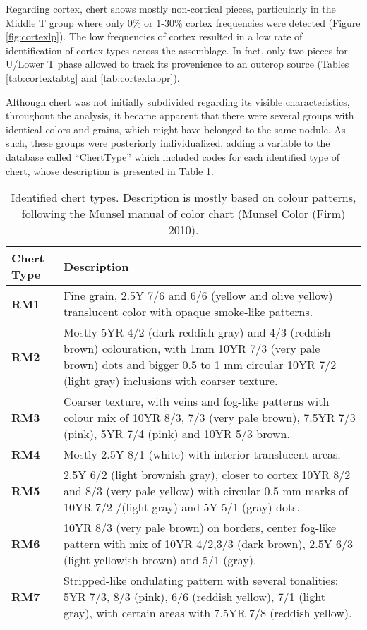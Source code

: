 \documentclass[12pt,twoside]{reedthesis}
\begin{document}
Regarding cortex, chert shows mostly non-cortical pieces, particularly in the Middle T group where only 0\% or 1-30\% cortex frequencies were detected (Figure \ref{fig:cortexlp}). The low frequencies of cortex resulted in a low rate of identification of cortex types across the assemblage. In fact, only two pieces for U/Lower T phase allowed to track its provenience to an outcrop source (Tables \ref{tab:cortextabtg} and \ref{tab:cortextabpr}).

Although chert was not initially subdivided regarding its visible characteristics, throughout the analysis, it became apparent that there were several groups with identical colors and grains, which might have belonged to the same nodule. As such, these groups were posteriorly individualized, adding a variable to the database called ``ChertType'' which included codes for each identified type of chert, whose description is presented in Table \ref{tab:cherttable}.
\begin{table}

\caption{\label{tab:cherttable}Identified chert types. Description is mostly based on colour patterns, following the Munsel manual of color chart (Munsel Color (Firm) 2010).}
\centering
\begin{tabular}[t]{>{\bfseries}l>{\raggedright\arraybackslash}p{10cm}}
\toprule
Chert Type & Description\\
\midrule
RM1 & Fine grain, 2.5Y 7/6 and 6/6 (yellow and olive yellow) translucent color with opaque smoke-like patterns.\\
RM2 & Mostly 5YR 4/2 (dark reddish gray) and 4/3 (reddish brown) colouration, with 1mm 10YR 7/3 (very pale brown) dots and bigger 0.5 to 1 mm circular 10YR 7/2 (light gray) inclusions with coarser texture.\\
RM3 & Coarser texture, with veins and fog-like patterns with colour mix of 10YR 8/3, 7/3 (very pale brown), 7.5YR 7/3 (pink), 5YR 7/4 (pink) and 10YR 5/3 brown.\\
RM4 & Mostly 2.5Y 8/1 (white) with interior translucent areas.\\
RM5 & 2.5Y 6/2 (light brownish gray), closer to cortex 10YR 8/2 and 8/3 (very pale yellow) with circular 0.5 mm marks of 10YR 7/2 /(light gray) and 5Y 5/1 (gray) dots.\\
\addlinespace
RM6 & 10YR 8/3 (very pale brown) on borders, center fog-like pattern with mix of 10YR 4/2,3/3 (dark brown), 2.5Y 6/3 (light yellowish brown) and 5/1 (gray).\\
RM7 & Stripped-like ondulating pattern with several tonalities: 5YR 7/3, 8/3 (pink), 6/6 (reddish yellow), 7/1 (light gray), with certain areas with 7.5YR 7/8 (reddish yellow).\\
\bottomrule
\end{tabular}
\end{table}
\end{document}
